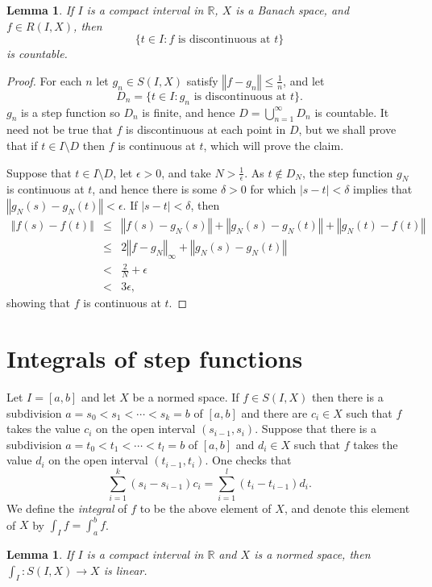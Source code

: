 \documentclass{article}
\newcommand{\norm}[1]{\left\Vert #1 \right\Vert}
\newtheorem{lemma}[theorem]{Lemma}
\theoremstyle{definition}
\begin{document}
\begin{lemma}
If $I$ is a compact interval in $\mathbb{R}$,  $X$ is a Banach space, and  $f \in R(I,X)$, then 
\[
\{t \in I: \textrm{$f$ is discontinuous at $t$}\}
\]
is countable.
\label{countable}
\end{lemma}
\begin{proof}
For each $n$ let $g_n \in S(I,X)$ satisfy $\norm{f-g_n} \leq \frac{1}{n}$, and let
\[
D_n=\{t \in I: \textrm{$g_n$ is discontinuous at $t$}\}.
\]
$g_n$ is a step function so $D_n$ is finite, and hence $D=\bigcup_{n=1}^\infty D_n$ is countable.
It need not be true that
$f$ is discontinuous at each point in $D$, but we shall prove that
if $t \in I \setminus D$ then $f$ is continuous at $t$, which will prove the claim.

Suppose that $t \in I \setminus D$,  let $\epsilon>0$, and take $N>\frac{1}{\epsilon}$. 
As $t \not \in D_N$, the step function $g_N$ is continuous at $t$, and hence there is some
$\delta>0$ for which $|s-t|<\delta$ implies that $\norm{g_N(s)-g_N(t)}<\epsilon$.
If $|s-t| < \delta$, then
\begin{eqnarray*}
\norm{f(s)-f(t)} &\leq& \norm{f(s)-g_N(s)}+\norm{g_N(s)-g_N(t)}+\norm{g_N(t)-f(t)}\\
&\leq&2\norm{f-g_N}_\infty + \norm{g_N(s)-g_N(t)}\\
&<&\frac{2}{N} + \epsilon\\
&<&3\epsilon,
\end{eqnarray*}
showing that $f$ is continuous at $t$. 
\end{proof}



\section{Integrals of step functions}
Let $I=[a,b]$ and let $X$ be a normed space. If $f \in S(I,X)$ then there is a subdivision $a=s_0<s_1<\cdots<s_k=b$ of $[a,b]$ and there are
$c_i \in X$ such that $f$ takes the value $c_i$ on the open interval $(s_{i-1},s_i)$. Suppose that there is a subdivision $a=t_0<t_1<\cdots<t_l=b$ of $[a,b]$ and 
$d_i \in X$ such that $f$ takes the value $d_i$ on the open interval $(t_{i-1},t_i)$. 
One checks that
\[
\sum_{i=1}^k (s_i-s_{i-1})c_i = \sum_{i=1}^l (t_i-t_{i-1})d_i.
\]
We define the {\em integral}  of $f$ to be the above element of $X$, and denote this element of $X$ by $\int_I f=\int_a^b f$.

\begin{lemma}
If $I$ is a compact interval in $\mathbb{R}$ and $X$ is a normed space, then $\int_I:S(I,X) \to X$ is linear.
\end{lemma}
\end{document}
